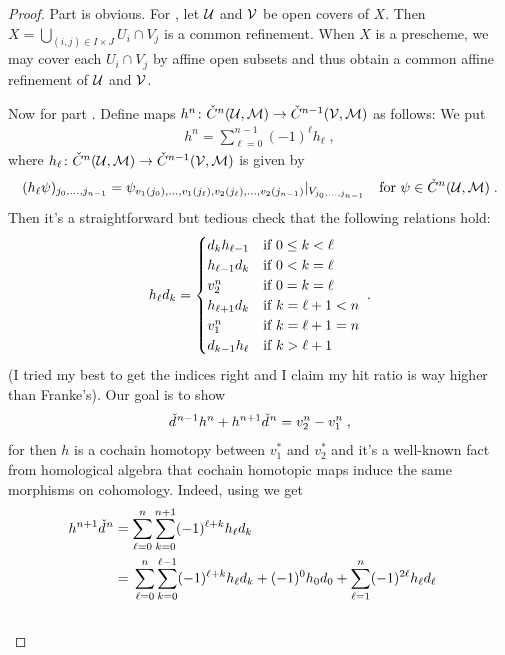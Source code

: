 \documentclass[a4paper,parskip=half,numbers=enddot, DIV=12]{scrreprt}
\begin{document}
\begin{proof}
	Part  is obvious. For , let $\mathcal{U}$ and $\mathcal{V}$ be open covers of $X$. Then $X=\bigcup_{(i,j)\in I\times J}U_i\cap V_j$ is a common refinement. When $X$ is a prescheme, we may cover each $U_i\cap V_j$ by affine open subsets and thus obtain a common affine refinement of $\mathcal{U}$ and $\mathcal{V}$.
	
	Now for part . Define maps $h^n\colon\check{C}^n(\Uu,\Mm)\morphism\check{C}^{n-1}(\Vv,\Mm)$ as follows: We put 
	\begin{align*}
		h^n=\sum_{\ell=0}^{n-1}(-1)^\ell h_\ell\;,
	\end{align*}
	where $h_\ell\colon\check{C}^n(\Uu,\Mm)\morphism\check{C}^{n-1}(\Vv,\Mm)$ is given by
	\begin{align*}
		(h_\ell\psi)_{j_0,\ldots,j_{n-1}}=\psi_{v_1(j_0),\ldots,v_1(j_\ell),v_2(j_\ell),\ldots,v_2(j_{n-1})}|_{V_{j_0,\ldots,j_{n-1}}}\quad\text{for }\psi\in\check{C}^n(\mathcal{U},\mathcal{M})\;.
	\end{align*}
	Then it's a straightforward but tedious check that the following relations hold:
	\begin{align}\lbl{eq:SHIT}
		h_\ell d_k=\begin{cases}
			d_kh_{\ell-1} & \text{if }0\leq k<\ell\\
			h_{\ell-1}d_{k} & \text{if }0< k=\ell\\
			v_2^n & \text{if }0=k=\ell\\
			h_{\ell+1}d_{k} & \text{if }k=\ell+1<n\\
			v_1^n & \text{if }k=\ell+1=n\\
			d_{k-1}h_\ell & \text{if }k>\ell+1
		\end{cases}\;.
	\end{align}
	(I tried my best to get the indices right and I claim my hit ratio is way higher than Franke's). Our goal is to show 
	\begin{align*}
		\check{d}\hspace{0.06125em}^{n-1}h^n+h^{n+1}\check{d}\hspace{0.06125em}^n=v_2^n-v_1^n\;,
	\end{align*}
	for then $h$ is a cochain homotopy between $v_1^*$ and $v_2^*$ and it's a well-known fact from homological algebra that cochain homotopic maps induce the same morphisms on cohomology. Indeed, using  we get
	\begin{align*}
		h^{n+1}\hacek{d}^n&=\sum_{\ell=0}^{n}\sum_{k=0}^{n+1}(-1)^{\ell+k}h_\ell d_k\\
		&=\begin{multlined}[t]
			\sum_{\ell=0}^{n}\sum_{k=0}^{\ell-1}(-1)^{\ell+k}h_\ell d_k+(-1)^0h_0d_0+\sum_{\ell=1}^{n}(-1)^{2\ell}h_\ell d_\ell\\

\end{multlined}
\end{align*}
\end{proof}
\end{document}
